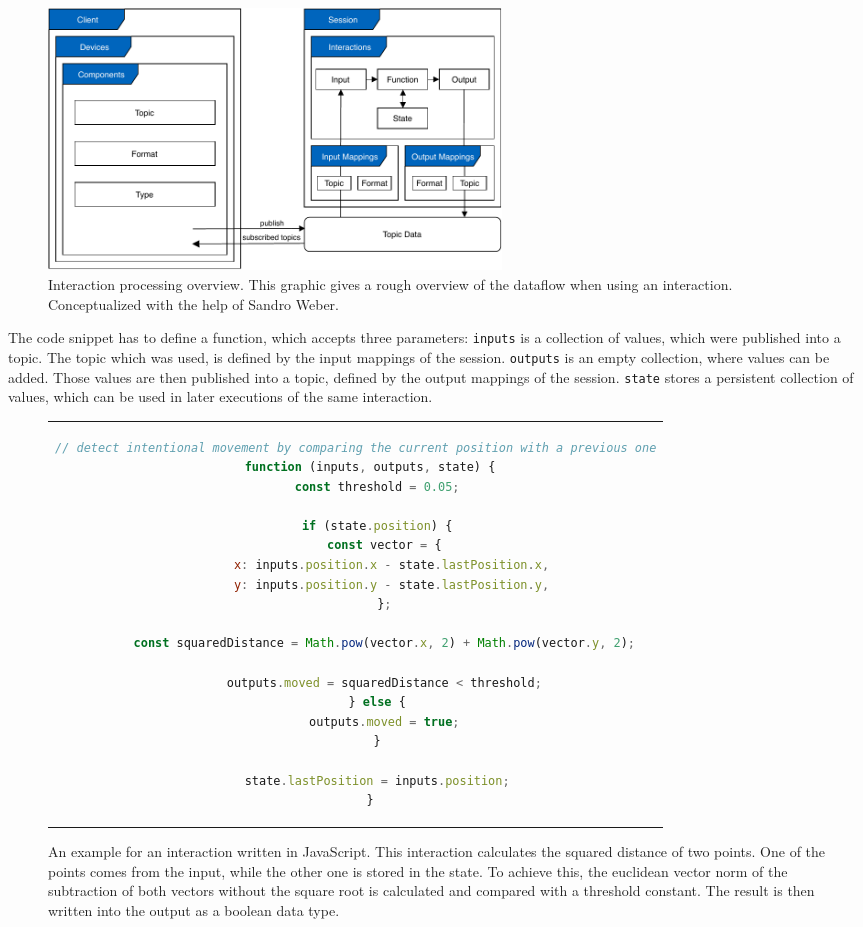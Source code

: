 \begin{figure}[htpb]
  \centering
  \includegraphics[width=12cm]{figures/ubii_cd.pdf}
  \caption[UBII Communication Diagram]{Interaction processing overview. This graphic gives a rough overview of the dataflow when using an interaction. Conceptualized with the help of Sandro Weber.}\label{fig:ubii_cd}
\end{figure}

The code snippet has to define a function, which accepts three parameters: 
\lstinline{inputs} is a collection of values, which were published into a topic. The topic which was used, is defined by the input mappings of the session. \lstinline{outputs} is an empty collection, where values can be added. Those values are then published into a topic, defined by the output mappings of the session. \lstinline{state} stores a persistent collection of values, which can be used in later executions of the same interaction.

\begin{figure}[htpb]
  \centering
  \begin{tabular}{c}
  \begin{lstlisting}[language=JavaScript]
    // detect intentional movement by comparing the current position with a previous one
    function (inputs, outputs, state) {
      const threshold = 0.05;

      if (state.position) {
        const vector = {
          x: inputs.position.x - state.lastPosition.x,
          y: inputs.position.y - state.lastPosition.y,
        };
  
        const squaredDistance = Math.pow(vector.x, 2) + Math.pow(vector.y, 2);
  
        outputs.moved = squaredDistance < threshold;
      } else {
        outputs.moved = true;
      }

      state.lastPosition = inputs.position;
    }
  \end{lstlisting}
  \end{tabular}
  \caption[Basic Interaction]{An example for an interaction written in JavaScript. This interaction calculates the squared distance of two points. One of the points comes from the input, while the other one is stored in the state. To achieve this, the euclidean vector norm of the subtraction of both vectors without the square root is calculated and compared with a threshold constant. The result is then written into the output as a boolean data type.}\label{fig:ubii_interaction_example}
\end{figure}

